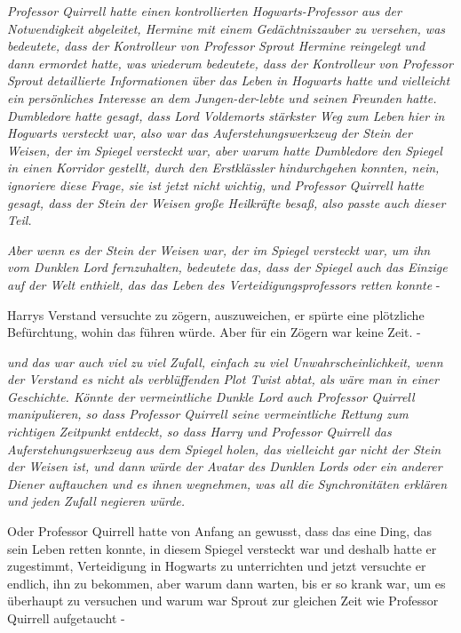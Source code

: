 {\emph{Professor Quirrell hatte einen kontrollierten Hogwarts-Professor aus der Notwendigkeit abgeleitet, Hermine mit einem Gedächtniszauber zu versehen, was bedeutete, dass der Kontrolleur von Professor Sprout Hermine reingelegt und dann ermordet hatte, was wiederum bedeutete, dass der Kontrolleur von Professor Sprout detaillierte Informationen über das Leben in Hogwarts hatte und vielleicht ein persönliches Interesse an dem Jungen-der-lebte und seinen Freunden hatte.\\ Dumbledore hatte gesagt, dass Lord Voldemorts stärkster Weg zum Leben hier in Hogwarts versteckt war, also war das Auferstehungswerkzeug der Stein der Weisen, der im Spiegel versteckt war, aber warum hatte Dumbledore den Spiegel in einen Korridor gestellt, durch den Erstklässler hindurchgehen konnten, nein, ignoriere diese Frage, sie ist jetzt nicht wichtig, und Professor Quirrell hatte gesagt, dass der Stein der Weisen große Heilkräfte besaß, also passte auch dieser Teil.}

\emph{Aber wenn es der Stein der Weisen war, der im Spiegel versteckt war, um ihn vom Dunklen Lord fernzuhalten, bedeutete das, dass der Spiegel auch das Einzige auf der Welt enthielt, das das Leben des Verteidigungsprofessors retten konnte} -

Harrys Verstand versuchte zu zögern, auszuweichen, er spürte eine plötzliche Befürchtung, wohin das führen würde. Aber für ein Zögern war keine Zeit. -

\emph{und das war auch viel zu viel Zufall, einfach zu viel Unwahrscheinlichkeit, wenn der Verstand es nicht als verblüffenden Plot Twist abtat, als wäre man in einer Geschichte. Könnte der vermeintliche Dunkle Lord auch Professor Quirrell manipulieren, so dass Professor Quirrell seine vermeintliche Rettung zum richtigen Zeitpunkt entdeckt, so dass Harry und Professor Quirrell das Auferstehungswerkzeug aus dem Spiegel holen, das vielleicht gar nicht der Stein der Weisen ist, und dann würde der Avatar des Dunklen Lords oder ein anderer Diener auftauchen und es ihnen wegnehmen, was all die Synchronitäten erklären und jeden Zufall negieren würde.}

Oder Professor Quirrell hatte von Anfang an gewusst, dass das eine Ding, das sein Leben retten konnte, in diesem Spiegel versteckt war und deshalb hatte er zugestimmt, Verteidigung in Hogwarts zu unterrichten und jetzt versuchte er endlich, ihn zu bekommen, aber warum dann warten, bis er so krank war, um es überhaupt zu versuchen und warum war Sprout zur gleichen Zeit wie Professor Quirrell aufgetaucht -

}
